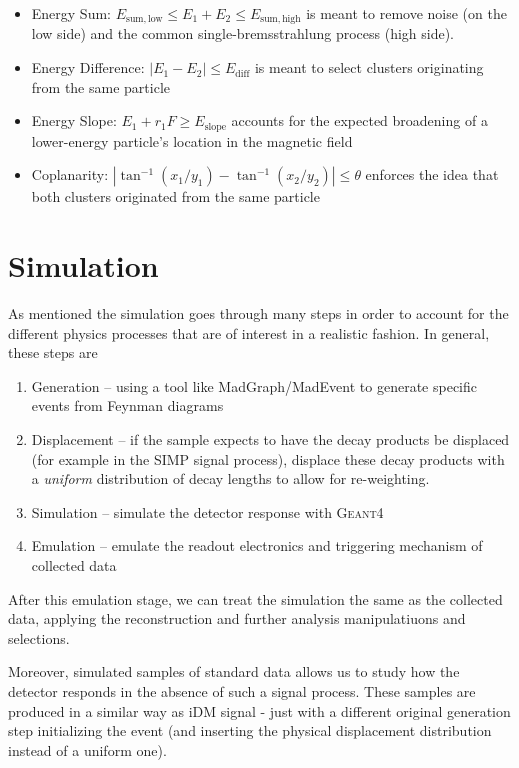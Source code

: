 \begin{itemize}
  \item Energy Sum: $E_\mathrm{sum,low} \leq E_1+E_2 \leq E_\mathrm{sum,high}$ is meant to
    remove noise (on the low side) and the common single-bremsstrahlung process (high side).
  \item Energy Difference: $|E_1-E_2| \leq E_\mathrm{diff}$ is meant to select clusters
    originating from the same particle
  \item Energy Slope: $E_1 + r_1F \geq E_\mathrm{slope}$ accounts for the expected broadening
    of a lower-energy particle's location in the magnetic field
  \item Coplanarity: $|\tan^{-1}(x_1/y_1) - \tan^{-1}(x_2/y_2)| \leq \theta$ enforces the
    idea that both clusters originated from the same particle
\end{itemize}


\section{Simulation} \label{sec:hps:sim}
As mentioned the simulation goes through many steps in order to account for the different physics
processes that are of interest in a realistic fashion. In general, these steps are
\begin{enumerate}
  \item Generation -- using a tool like {\sc MadGraph/MadEvent} to generate
        specific events from Feynman diagrams
  \item Displacement -- if the sample expects to have the decay products be displaced (for example in the
        SIMP signal process), displace these decay products with a \emph{uniform} distribution of decay
        lengths to allow for re-weighting.
  \item Simulation -- simulate the detector response with \textsc{Geant4}\cite{geant4}
  \item Emulation -- emulate the readout electronics and triggering mechanism of collected data
\end{enumerate}
After this emulation stage, we can treat the simulation the same as the collected data,
applying the reconstruction and further analysis manipulatiuons and selections.

Moreover, simulated samples of standard data allows us to study how the detector responds in the
absence of such a signal process. These samples are produced in a similar way as iDM signal - just
with a different original generation step initializing the event (and inserting the physical
displacement distribution instead of a uniform one).

